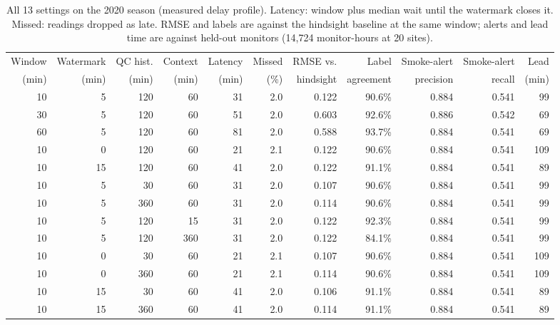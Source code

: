 \documentclass[10pt,journal,compsoc]{IEEEtran}
\begin{document}
\begin{table}[t]
\caption{All 13 settings on the 2020 season (measured delay profile). Latency: window plus median wait until the watermark closes it. Missed: readings dropped as late. RMSE and labels are against the hindsight baseline at the same window; alerts and lead time are against held-out monitors (14,724 monitor-hours at 20 sites).}
\label{tab:sweep}
\centering\footnotesize
\begin{tabular}{rrrrrrrrrrr}
\toprule
Window & Watermark & QC hist. & Context & Latency & Missed & RMSE vs. & Label & Smoke-alert & Smoke-alert & Lead \\
(min) & (min) & (min) & (min) & (min) & (\%) & hindsight & agreement & precision & recall & (min) \\
\midrule
10 & 5 & 120 & 60 & 31 & 2.0 & 0.122 & 90.6\% & 0.884 & 0.541 & 99 \\
30 & 5 & 120 & 60 & 51 & 2.0 & 0.603 & 92.6\% & 0.886 & 0.542 & 69 \\
60 & 5 & 120 & 60 & 81 & 2.0 & 0.588 & 93.7\% & 0.884 & 0.541 & 69 \\
10 & 0 & 120 & 60 & 21 & 2.1 & 0.122 & 90.6\% & 0.884 & 0.541 & 109 \\
10 & 15 & 120 & 60 & 41 & 2.0 & 0.122 & 91.1\% & 0.884 & 0.541 & 89 \\
10 & 5 & 30 & 60 & 31 & 2.0 & 0.107 & 90.6\% & 0.884 & 0.541 & 99 \\
10 & 5 & 360 & 60 & 31 & 2.0 & 0.114 & 90.6\% & 0.884 & 0.541 & 99 \\
10 & 5 & 120 & 15 & 31 & 2.0 & 0.122 & 92.3\% & 0.884 & 0.541 & 99 \\
10 & 5 & 120 & 360 & 31 & 2.0 & 0.122 & 84.1\% & 0.884 & 0.541 & 99 \\
10 & 0 & 30 & 60 & 21 & 2.1 & 0.107 & 90.6\% & 0.884 & 0.541 & 109 \\
10 & 0 & 360 & 60 & 21 & 2.1 & 0.114 & 90.6\% & 0.884 & 0.541 & 109 \\
10 & 15 & 30 & 60 & 41 & 2.0 & 0.106 & 91.1\% & 0.884 & 0.541 & 89 \\
10 & 15 & 360 & 60 & 41 & 2.0 & 0.114 & 91.1\% & 0.884 & 0.541 & 89 \\
\bottomrule
\end{tabular}
\end{table}
\end{document}
